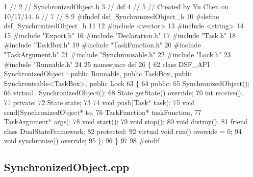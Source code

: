 \begin{DoxyCodeInclude}
1 \textcolor{comment}{//}
2 \textcolor{comment}{//  SynchronizedObject.h}
3 \textcolor{comment}{//  dsf}
4 \textcolor{comment}{//}
5 \textcolor{comment}{//  Created by Yu Chen on 10/17/14.}
6 \textcolor{comment}{//}
7 \textcolor{comment}{//}
8 
9 \textcolor{preprocessor}{#ifndef dsf\_SynchronizedObject\_h}
10 \textcolor{preprocessor}{#define dsf\_SynchronizedObject\_h}
11 
12 \textcolor{preprocessor}{#include <vector>}
13 \textcolor{preprocessor}{#include <string>}
14 
15 \textcolor{preprocessor}{#include "Export.h"}
16 \textcolor{preprocessor}{#include "Declaration.h"}
17 \textcolor{preprocessor}{#include "Task.h"}
18 \textcolor{preprocessor}{#include "TaskBox.h"}
19 \textcolor{preprocessor}{#include "TaskFunction.h"}
20 \textcolor{preprocessor}{#include "TaskArgument.h"}
21 \textcolor{preprocessor}{#include "Synchronisable.h"}
22 \textcolor{preprocessor}{#include "Lock.h"}
23 \textcolor{preprocessor}{#include "Runnable.h"}
24 
25 \textcolor{keyword}{namespace }dsf
26 \{
62     \textcolor{keyword}{class }DSF\_API SynchronizedObject : \textcolor{keyword}{public} Runnable, \textcolor{keyword}{public} TaskBox, \textcolor{keyword}{public} Synchronisable<TaskBox>, \textcolor{keyword}{
      public} Lock
63     \{
64     \textcolor{keyword}{public}:
65         SynchronizedObject();
66         \textcolor{keyword}{virtual} ~SynchronizedObject();
68         State getState() \textcolor{keyword}{override};
70         \textcolor{keywordtype}{int} receive();
71     \textcolor{keyword}{private}:
72         State state;
73         
74         \textcolor{keywordtype}{void} push(Task* task);
75         \textcolor{keywordtype}{void} send(SynchronizedObject* to,
76                   TaskFunction* taskFunction,
77                   TaskArgument* args);
78         \textcolor{keywordtype}{void} start();
79         \textcolor{keywordtype}{void} stop();
80         \textcolor{keywordtype}{void} distroy();
81         \textcolor{keyword}{friend} \textcolor{keyword}{class }DualStateFramework;
82     \textcolor{keyword}{protected}:
92         \textcolor{keyword}{virtual} \textcolor{keywordtype}{void} run() \textcolor{keyword}{override} = 0;
94         \textcolor{keywordtype}{void} synchronise() \textcolor{keyword}{override};
95     \};
96 \}
97 
98 \textcolor{preprocessor}{#endif}
\end{DoxyCodeInclude}
 \hypertarget{_dual_state_framework_DualStateFrameworkSynchronizedObject_cpp}{}\subsection{Synchronized\+Object.\+cpp}\label{_dual_state_framework_DualStateFrameworkSynchronizedObject_cpp}
